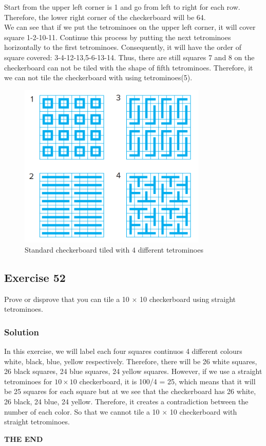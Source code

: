 \documentclass{article}
\begin{document}
\begin{enumerate} [label = (\alph*)]
\begin{itemize}
        Start from the upper left corner is 1 and go from left to right for each row.
        Therefore, the lower right corner of the checkerboard will be 64.\\ 
        We can see that if we put the tetrominoes on the upper left corner, it will
        cover square 1-2-10-11. Continue this process by putting the next tetrominoes horizontally
        to the first tetrominoes. Consequently, it will have the order of square covered:
        3-4-12-13,5-6-13-14. Thus, there are still squares 7 and 8 on the checkerboard can not be tiled with
        the shape of fifth tetrominoes. Therefore, it we can not tile the checkerboard with using tetrominoes(5).
    \end{itemize}
    \begin{figure}
        \begin{center}
            \includegraphics[width = 0.8\textwidth]{CheckerTileWith4Cases.png}
            \caption{Standard checkerboard tiled with 4 different tetrominoes}
        \end{center}
    \end{figure}
\end{enumerate}
\clearpage
\subsection*{Exercise 52}
Prove or disprove that you can tile a 10 $ \times $ 10 checkerboard using straight tetrominoes.
\subsubsection*{Solution}
In this exercise, we will label each four squares continuos 4 different colours 
white, black, blue, yellow respectively. Therefore, there will be 26 white squares,
26 black squares, 24 blue squares, 24 yellow squares. However, if we use
a straight tetrominoes for $ 10 \times 10 $ checkerboard, it is 100/4 = 25, which means that 
it will be 25 squares for each square but at we see that the checkerboard
has 26 white, 26 black, 24 blue, 24 yellow. Therefore, it creates a contradiction between the number
of each color. So that we cannot tile a 10 $\times$ 10 checkerboard with straight tetrominoes.
\begin{center}
    \textbf{THE END}
\end{center}
\end{document}
